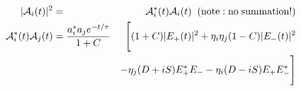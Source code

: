 \documentclass[a4paper,10pt,twosided]{article}
\begin{document}

\begin{eqnarray}
   |{\cal A}_i(t)|^2  &=& {\cal A}_i^*(t){\cal A}_i(t) \;\; (\mathrm{note: no\; summation!}) \\
  {\cal A}_i^*(t) {\cal A}_j(t) &= \frac{ a_i^* a_j e^{-t/\tau}} {1+C}&\Biggl[ (1+C) |E_+(t)|^2  +\eta_i\eta_j (1-C)|E_-(t)|^2 \nonumber\\
                                                                          && - \eta_j(D+iS)E_+^*E_--\eta_i(D-iS)E_+E_-^*   \Biggr] \\

\end{eqnarray}
\end{document}
